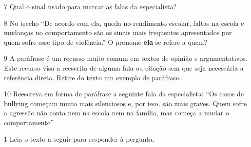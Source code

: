 
\num{7} Qual o sinal usado para marcar as falas da especialista?


\num{8} No trecho ``De acordo com ela, queda no rendimento escolar, faltas na
escola e mudanças no comportamento são os sinais mais frequentes
apresentados por quem sofre esse tipo de violência.'' O pronome \textbf{ela} se
refere a quem?


\num{9} A paráfrase é um recurso muito comum em textos de opinião e
argumentativos. Este recurso visa a reescrita de alguma fala ou
citação sem que seja necessária a referência direta. Retire do texto
um exemplo de paráfrase.


\num{10} Reescreva em forma de paráfrase a seguinte fala da especialista: ``Os 
casos de bullying começam muito mais silenciosos e, por isso, são mais graves. 
Quem sofre a agressão não conta nem na escola nem na família, mas começa a mudar 
o comportamento''



\num{1} Leia o texto a seguir para responder à pergunta.

